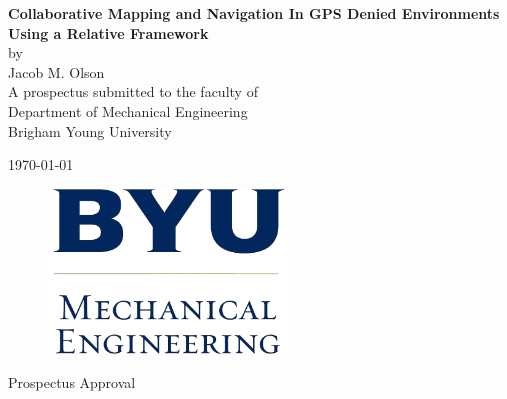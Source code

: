\documentclass[12pt, letterpaper]{article}
\begin{document}
\begin{titlepage}

\begin{center}

\vspace*{\fill}

\vspace{0.5in}

{ \LARGE \bfseries Collaborative Mapping and Navigation In GPS Denied Environments Using a Relative Framework}\\[.25in]

\large
by\\[.25 in]
Jacob M. Olson\\[1in]

A prospectus submitted to the faculty of\\
Department of Mechanical Engineering\\
Brigham Young University

\vspace{1in}

\today

\vspace*{\fill}

\end{center}

\end{titlepage}

\thispagestyle{empty}

\begin{center}
\vspace*{\fill}

\begin{figure}[htbp] %
   \centering
   \includegraphics[width=2.5in]{byume_logo_clear.jpg} 
\end{figure}

\vspace{0.5in}

\Large{Prospectus Approval}\\[0.5in]

\end{center}
\end{document}
